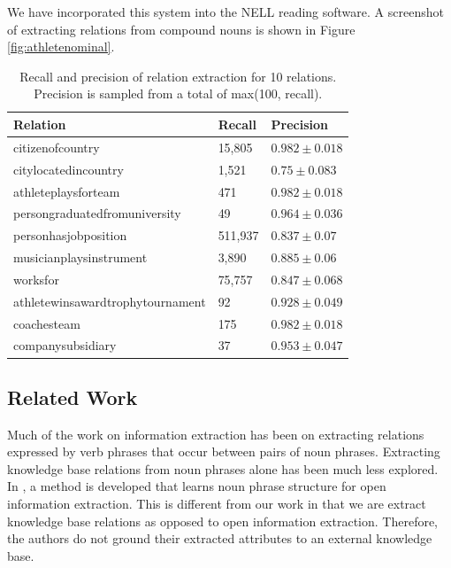 We have incorporated this system into the NELL reading software. A screenshot of extracting relations from compound nouns is shown in Figure \ref{fig:athletenominal}.



\begin{table}[h]
%
\centering
%
 \begin{tabular}{l|l|l}
 \hline
 Relation & Recall & Precision \\
   \hline
   citizenofcountry & 15,805 &$0.982\pm0.018$ \\
citylocatedincountry & 1,521 & $0.75\pm0.083$ \\
athleteplaysforteam &471 & $0.982\pm0.018$ \\
persongraduatedfromuniversity& 49 & $0.964\pm0.036$ \\
personhasjobposition & 511,937 & $0.837\pm0.07$ \\
musicianplaysinstrument & 3,890 & $0.885\pm0.06$ \\
worksfor & 75,757 &  $0.847\pm0.068$ \\
athletewinsawardtrophytournament & 92 & $0.928\pm0.049$ \\
coachesteam& 175 & $0.982\pm0.018$ \\
companysubsidiary& 37 & $0.953\pm0.047$ \\
   \hline
 \end{tabular}
 \caption{Recall and  precision of relation extraction for 10 relations. Precision is sampled
 from a total of max(100, recall).}
   \label{tab:nominalsresult}
 \end{table}





    
\subsection{Related Work}
Much of the work on information extraction has been on extracting relations expressed by verb phrases
that occur between pairs of noun phrases. Extracting knowledge base relations from noun phrases alone has been much less
explored. In \cite{conf/emnlp/YahyaWGH14}, a method is  developed that learns noun phrase
structure for open information extraction. This is different from our work in that we are extract 
knowledge base relations as opposed to open information extraction. Therefore, the authors
do not ground their extracted attributes to an
external knowledge base. 


